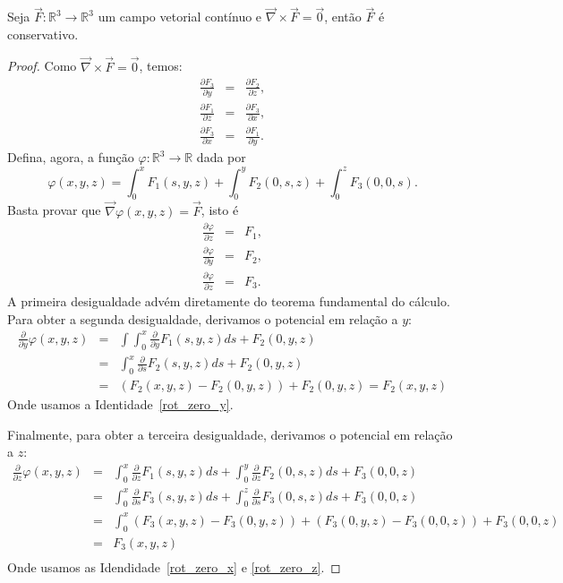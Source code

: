 \begin{teo} Seja $\vec{F}:\mathbb{R}^3\to\mathbb{R}^3$ um campo vetorial contínuo e $\vec{\nabla}\times \vec{F}=\vec{0}$, então $\vec{F}$ é conservativo.
 \end{teo}
\begin{proof} Como $\vec{\nabla}\times \vec{F}=\vec{0}$, temos:
\begin{eqnarray}
 \frac{\partial F_3}{\partial y} &=&\frac{\partial F_2}{\partial z}\label{rot_zero_x},\\
 \frac{\partial F_1}{\partial z} &=&\frac{\partial F_3}{\partial x}\label{rot_zero_y},\\
 \frac{\partial F_3}{\partial x} &=&\frac{\partial F_1}{\partial y}\label{rot_zero_z}.
\end{eqnarray}
Defina, agora, a função $\varphi:\mathbb{R}^3\to\mathbb{R}$ dada por
$$\varphi(x,y,z)=\int_0^xF_1(s,y,z) + \int_0^yF_2(0,s,z)+\int_0^zF_3(0,0,s).$$
Basta provar que $\vec{\nabla}\varphi(x,y,z)=\vec{F}$, isto é
\begin{eqnarray}
 \frac{\partial \varphi}{\partial z} &=&F_1,\label{rot_zero_der_x}\\
 \frac{\partial \varphi}{\partial y} &=&F_2,\label{rot_zero_der_y}\\
 \frac{\partial \varphi}{\partial z} &=&F_3\label{rot_zero_der_z}.
\end{eqnarray}
A primeira desigualdade advém diretamente do teorema fundamental do cálculo. Para obter a segunda desigualdade, derivamos o potencial em relação a $y$:
\begin{eqnarray*}
\frac{\partial }{\partial y}\varphi(x,y,z)&=&\int\int_0^x \frac{\partial }{\partial y}F_1(s,y,z)ds+ F_2(0,y,z)\\
&=&\int_0^x \frac{\partial }{\partial s}F_2(s,y,z)ds+ F_2(0,y,z)\\
&=&\left(F_2(x,y,z)-F_2(0,y,z)\right)+ F_2(0,y,z) = F_2(x,y,z)
\end{eqnarray*}
Onde usamos a Identidade~\ref{rot_zero_y}.

Finalmente, para obter a terceira desigualdade, derivamos o potencial em relação a $z$:
\begin{eqnarray*}
\frac{\partial }{\partial z}\varphi(x,y,z)&=&\int_0^x \frac{\partial }{\partial z}F_1(s,y,z)ds + \int_0^y \frac{\partial }{\partial z}F_2(0,s,z)ds+F_3(0,0,z)\\
&=&\int_0^x \frac{\partial }{\partial s}F_3(s,y,z)ds + \int_0^z \frac{\partial }{\partial s}F_3(0,s,z)ds+F_3(0,0,z)\\
&=&\int_0^x \left(F_3(x,y,z)-F_3(0,y,z)\right) + \left(F_3(0,y,z)-F_3(0,0,z)\right)+F_3(0,0,z)\\
&=&F_3(x,y,z)\\
\end{eqnarray*}
  Onde usamos as Idendidade~\ref{rot_zero_x} e \ref{rot_zero_z}.
\end{proof}

